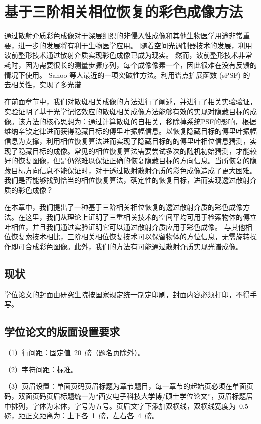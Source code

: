 
\chapter{基于三阶相关相位恢复的彩色成像方法}

通过散射介质彩色成像对于深层组织的非侵入性成像和其他生物医学用途非常重要，进一步的发展将有利于生物医学应用。 随着空间光调制器技术的发展，利用波前整形技术通过散射介质实现彩色成像已成为现实。 然而，波前整形技术非常耗时，因为需要很长的测量步骤序列，每个成像像素一个，因此很难在没有反馈的情况下使用。 Sahoo 等人最近的一项突破性方法。利用谱点扩展函数 (sPSF) 的去相关性，实现了多光谱

在前面章节中，我们对散斑相关成像的方法进行了阐述，并进行了相关实验验证，实验证明了基于光学记忆效应的散斑相关成像方法能够有效的实现对隐藏目标的成像。该方法的核心思想为：通过计算散斑的自相关，移除掉系统PSF的影响，根据维纳辛钦定律进而获得隐藏目标的傅里叶振幅信息。以恢复隐藏目标的傅里叶振幅信息为支撑，利用相位恢复算法进而实现了隐藏目标的的傅里叶相位信息猜测，实现了隐藏目标的成像。常见的相位恢复算法需要尝试多次的随机初始猜测，才能较好的恢复图像，但是仍然难以保证正确的恢复隐藏目标的方向信息。当所恢复的隐藏目标方向信息不能保证时，对于透过散射散射介质的彩色成像造成了更大困难。我们是否能够找到恰当的相位恢复算法，确定性的恢复目标，进而实现透过散射介质的彩色成像？

在本章中，我们提出了一种基于三阶相关相位恢复的透过散射介质的彩色成像方法。在这里，我们从理论上证明了三重相关技术的空间平均可用于检索物体的傅立叶相位，并且我们通过实验证明它可以通过散射介质应用于彩色成像。 与其他相位恢复索技术相比，三阶相关相位恢复技术可以保留物体的方位信息，无需旋转操作即可合成彩色图像。此外，我们的方法有可能通过散射介质实现光谱成像。

\section{现状}

学位论文的封面由研究生院按国家规定统一制定印刷，封面内容必须打印，不得手写。

\section{学位论文的版面设置要求}

（1）行间距：固定值~20~磅（题名页除外）。

（2）字符间距：标准。

（3）页眉设置：单面页码页眉标题为章节题目，每一章节的起始页必须在单面页码，双面页码页眉标题统一为“西安电子科技大学博/硕士学位论文”，页眉标题居中排列，字体为宋体，字号为五号。页眉文字下添加双横线，双横线宽度为~0.5~ 磅，距正文距离为：上下各~1~磅，左右各~4~磅。

